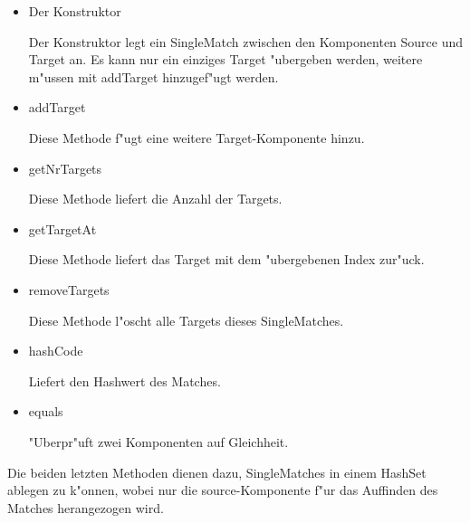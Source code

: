 \begin{itemize}
\item Der Konstruktor

Der Konstruktor legt ein SingleMatch zwischen den Komponenten Source und Target an. Es kann nur ein einziges Target "ubergeben werden, weitere m"ussen mit addTarget hinzugef"ugt werden.



\item addTarget

Diese Methode f"ugt eine weitere Target-Komponente hinzu.

\item getNrTargets

Diese Methode liefert die Anzahl der Targets.

\item getTargetAt

Diese Methode liefert das Target mit dem "ubergebenen Index zur"uck.

\item removeTargets

Diese Methode l"oscht alle Targets dieses SingleMatches.

\item hashCode

Liefert den Hashwert des Matches.

\item equals

"Uberpr"uft zwei Komponenten auf Gleichheit.

\end{itemize}

Die beiden letzten Methoden dienen dazu, SingleMatches in einem HashSet ablegen zu k"onnen, wobei nur die source-Komponente f"ur das Auffinden des Matches herangezogen wird.


